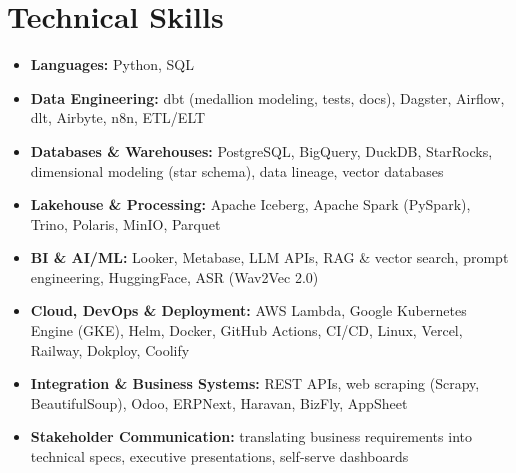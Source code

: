 
\section{Technical Skills}
\begin{itemize}[leftmargin=30pt, label=\textbullet, itemsep=1pt]
  \item \textbf{Languages:} Python, SQL
  \item \textbf{Data Engineering:} dbt (medallion modeling, tests, docs), Dagster, Airflow, dlt, Airbyte, n8n, ETL/ELT
  \item \textbf{Databases \& Warehouses:} PostgreSQL, BigQuery, DuckDB, StarRocks, dimensional modeling (star schema), data lineage, vector databases
  \item \textbf{Lakehouse \& Processing:} Apache Iceberg, Apache Spark (PySpark), Trino, Polaris, MinIO, Parquet
  \item \textbf{BI \& AI/ML:} Looker, Metabase, LLM APIs, RAG \& vector search, prompt engineering, HuggingFace, ASR (Wav2Vec 2.0)
  \item \textbf{Cloud, DevOps \& Deployment:} AWS Lambda, Google Kubernetes Engine (GKE), Helm, Docker, GitHub Actions, CI/CD, Linux, Vercel, Railway, Dokploy, Coolify
  \item \textbf{Integration \& Business Systems:} REST APIs, web scraping (Scrapy, BeautifulSoup), Odoo, ERPNext, Haravan, BizFly, AppSheet
  \item \textbf{Stakeholder Communication:} translating business requirements into technical specs, executive presentations, self-serve dashboards
\end{itemize}
